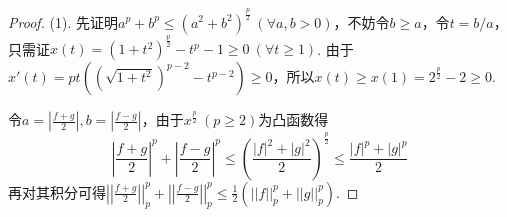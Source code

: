 \documentclass[12pt, a4paper, oneside]{ctexart}
\let\leq=\leqslant %
\let\geq=\geqslant %
\begin{document}
\begin{proof}
    (1). 先证明$a^p+b^p\leq (a^2+b^2)^{\frac{p}{2}}\ (\forall a,b > 0)$，不妨令$b\geq a$，令$t = b/a$，只需证$x(t) = (1+t^2)^{\frac{p}{2}}-t^p-1\geq 0\ (\forall t\geq 1)$. 由于$x'(t) = pt\left((\sqrt{1+t^2})^{p-2}-t^{p-2}\right)\geq 0$，所以$x(t)\geq x(1) = 2^{\frac{p}{2}}-2\geq 0$.

    令$a = \left|\frac{f+g}{2}\right|,b=\left|\frac{f-g}{2}\right|$，由于$x^{\frac{p}{2}}\ (p\geq 2)$为凸函数得
    \begin{equation*}
        \left|\frac{f+g}{2}\right|^p+\left|\frac{f-g}{2}\right|^p\leq \left(\frac{|f|^2+|g|^2}{2}\right)^{\frac{p}{2}}\leq \frac{|f|^p+|g|^p}{2}
    \end{equation*}
    再对其积分可得$\left|\left|\frac{f+g}{2}\right|\right|_p^p+\left|\left|\frac{f-g}{2}\right|\right|_p^p\leq \frac{1}{2}\left(||f||_p^p+||g||_p^p\right)$.
\end{proof}
\end{document}
